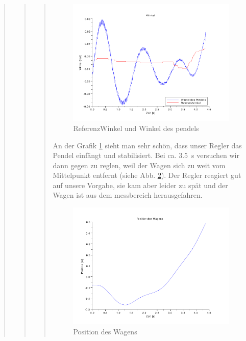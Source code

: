 \begin{quote}
\begin{quote}
\begin{quote}
            \begin{figure}[H]
            \centering
                \includegraphics[scale=0.7, trim = 0cm 0cm 0cm 0cm, clip]{Bilder/win_win_ref}
                    \caption{ReferenzWinkel und Winkel des pendels}
                    \label{fig:win_win_ref}
            \end{figure}
            
            An der Grafik \ref{fig:win_win_ref} sieht man sehr schön, dass unser Regler das Pendel einfängt und
            stabilisiert. Bei ca. \SI{3,5}{\second} versuchen wir dann gegen zu reglen, weil der Wagen sich zu weit vom
            Mittelpunkt entfernt (siehe Abb. \ref{fig:win_pos}). Der Regler reagiert gut auf unsere Vorgabe, sie kam
            aber leider zu spät und der Wagen ist aus dem messbereich herausgefahren.
            
            \begin{figure}[H]
            \centering
                \includegraphics[scale=0.7, trim = 0cm 0cm 0cm 0cm, clip]{Bilder/win_pos}
                    \caption{Position des Wagens}
                    \label{fig:win_pos}
            \end{figure}
            

\end{quote}
\end{quote}
\end{quote}

